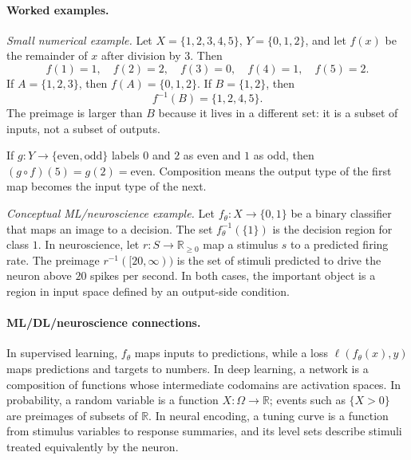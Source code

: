 \paragraph{Worked examples.}
\emph{Small numerical example.} Let \(X=\{1,2,3,4,5\}\), \(Y=\{0,1,2\}\), and let \(f(x)\) be the remainder of \(x\) after division by \(3\). Then
\[
f(1)=1,\quad f(2)=2,\quad f(3)=0,\quad f(4)=1,\quad f(5)=2.
\]
If \(A=\{1,2,3\}\), then \(f(A)=\{0,1,2\}\). If \(B=\{1,2\}\), then
\[
f^{-1}(B)=\{1,2,4,5\}.
\]
The preimage is larger than \(B\) because it lives in a different set: it is a subset of inputs, not a subset of outputs.

If \(g:Y\to\{\text{even},\text{odd}\}\) labels \(0\) and \(2\) as even and \(1\) as odd, then \((g\circ f)(5)=g(2)=\text{even}\). Composition means the output type of the first map becomes the input type of the next.

\emph{Conceptual ML/neuroscience example.} Let \(f_\theta:X\to\{0,1\}\) be a binary classifier that maps an image to a decision. The set \(f_\theta^{-1}(\{1\})\) is the decision region for class \(1\). In neuroscience, let \(r:S\to\mathbb{R}_{\ge 0}\) map a stimulus \(s\) to a predicted firing rate. The preimage \(r^{-1}([20,\infty))\) is the set of stimuli predicted to drive the neuron above \(20\) spikes per second. In both cases, the important object is a region in input space defined by an output-side condition.

\paragraph{ML/DL/neuroscience connections.}
In supervised learning, \(f_\theta\) maps inputs to predictions, while a loss \(\ell(f_\theta(x),y)\) maps predictions and targets to numbers. In deep learning, a network is a composition of functions whose intermediate codomains are activation spaces. In probability, a random variable is a function \(X:\Omega\to\mathbb{R}\); events such as \(\{X>0\}\) are preimages of subsets of \(\mathbb{R}\). In neural encoding, a tuning curve is a function from stimulus variables to response summaries, and its level sets describe stimuli treated equivalently by the neuron.


